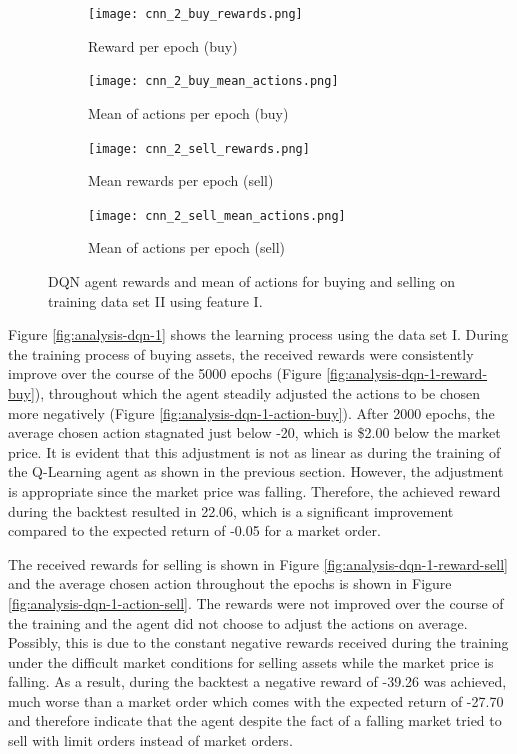 \begin{figure}[H]
    \centering
    \begin{subfigure}[b]{0.4\textwidth}
        \texttt{[image: cnn\_2\_buy\_rewards.png]}
        \caption{Reward per epoch (buy)}
        \label{fig:analysis-dqn-2-reward-buy}
    \end{subfigure}
    \begin{subfigure}[b]{0.4\textwidth}
        \texttt{[image: cnn\_2\_buy\_mean\_actions.png]}
        \caption{Mean of actions per epoch (buy)}
        \label{fig:analysis-dqn-2-action-buy}
    \end{subfigure}
    \begin{subfigure}[b]{0.4\textwidth}
        \texttt{[image: cnn\_2\_sell\_rewards.png]}
        \caption{Mean rewards per epoch (sell)}
        \label{fig:analysis-dqn-2-reward-sell}
    \end{subfigure}
    \begin{subfigure}[b]{0.4\textwidth}
        \texttt{[image: cnn\_2\_sell\_mean\_actions.png]}
        \caption{Mean of actions per epoch (sell)}
        \label{fig:analysis-dqn-2-action-sell}
    \end{subfigure}
    \caption{DQN agent rewards and mean of actions for buying and selling on training data set II using feature I.}
    \label{fig:analysis-dqn-2}
\end{figure}

Figure \ref{fig:analysis-dqn-1} shows the learning process using the data set I.
During the training process of buying assets, the received rewards were consistently improve over the course of the 5000 epochs (Figure \ref{fig:analysis-dqn-1-reward-buy}), throughout which the agent steadily adjusted the actions to be chosen more negatively (Figure \ref{fig:analysis-dqn-1-action-buy}).
After 2000 epochs, the average chosen action stagnated just below -20, which is \$2.00 below the market price.
It is evident that this adjustment is not as linear as during the training of the Q-Learning agent as shown in the previous section.
However, the adjustment is appropriate since the market price was falling.
Therefore, the achieved reward during the backtest resulted in 22.06, which is a significant improvement compared to the expected return of -0.05 for a market order.

The received rewards for selling is shown in Figure \ref{fig:analysis-dqn-1-reward-sell} and the average chosen action throughout the epochs is shown in Figure \ref{fig:analysis-dqn-1-action-sell}.
The rewards were not improved over the course of the training and the agent did not choose to adjust the actions on average.
Possibly, this is due to the constant negative rewards received during the training under the difficult market conditions for selling assets while the market price is falling.
As a result, during the backtest a negative reward of -39.26 was achieved, much worse than a market order which comes with the expected return of -27.70 and therefore indicate that the agent despite the fact of a falling market tried to sell with limit orders instead of market orders.

